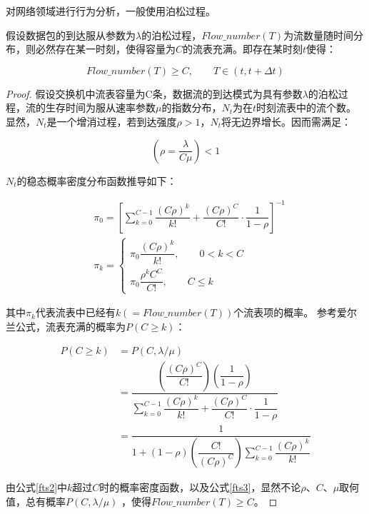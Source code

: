对网络领域进行行为分析，一般使用泊松过程。

\begin{theorem}%
	假设数据包的到达服从参数为$\lambda$的泊松过程，$ Flow\_number(T) $为流数量随时间分布，则必然存在某一时刻，使得容量为$C$的流表充满。即存在某时刻$t$使得：
	
	\begin{equation}
	Flow\_number(T) \geq C, \qquad T \in (t,t+\Delta t)
	\end{equation}
	
\end{theorem}


\begin{proof}
	假设交换机中流表容量为C条，数据流的到达模式为具有参数$\lambda$的泊松过程，流的生存时间为服从速率参数$\mu$的指数分布，$N_t$为在$t$时刻流表中的流个数。显然，$N_t$是一个增消过程，若到达强度$\rho>1$，$N_t$将无边界增长。因而需满足：
	
	\begin{equation}
	(\rho=\dfrac{\lambda}{C\mu})<1
	\end{equation}
	
	$N_t$的稳态概率密度分布函数推导如下：
	
	
	
	\begin{align}\label{fts1}
	&\pi_0 = [\sum_{k=0}^{C-1}\dfrac{(C\rho)^k}{k!}+\dfrac{(C\rho)^C}{C!}\cdot\dfrac{1}{1-\rho}]^{-1}  \\
	&\pi_k = \begin{cases}\label{fts2}
	\pi_0\dfrac{(C\rho)^k}{k!}, \qquad 0<k<C \\
	\pi_0\dfrac{\rho^kC^C}{C!}, \qquad C \leq k
	\end{cases}
	\end{align}
	
	其中$\pi_k$代表流表中已经有$k(=Flow\_number(T))$个流表项的概率。
	参考爱尔兰公式，流表充满的概率为$ P(C\geq  k) $：
	
	\begin{align}\label{fts3}
	P(C\geq  k) &= P(C,\lambda/\mu) \nonumber \\
	&=\dfrac {\left( \dfrac {\left( C\rho\right)^C}{C!}\right) \left( \dfrac {1}{1-\rho }\right) }{\sum ^{C-1}_{k=0}\dfrac {\left( C\rho\right) ^{k}}{k!}+\dfrac {\left( C\rho\right) ^{C}}{C!}\cdot\dfrac {1}{1-\rho }} \nonumber  \\
	&=\dfrac {1}{1+\left( 1-\rho \right) \left( \dfrac {C!}{(C\rho)^{C}}\right) \sum ^{C-1}_{k=0}\dfrac {(C\rho)^{k}}{k!}}
	\end{align}	
	
	由公式\ref{fts2}中$ k $超过$ C $时的概率密度函数，以及公式\ref{fts3}，显然不论$ \rho $、$ C $、$\mu$取何值，总有概率$ P(C,\lambda/\mu) $ ，使得$ Flow\_number(T) \geq C $。
\end{proof}

